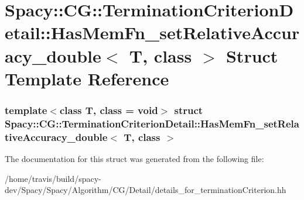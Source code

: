 \hypertarget{structSpacy_1_1CG_1_1TerminationCriterionDetail_1_1HasMemFn__setRelativeAccuracy__double}{\section{\-Spacy\-:\-:\-C\-G\-:\-:\-Termination\-Criterion\-Detail\-:\-:\-Has\-Mem\-Fn\-\_\-set\-Relative\-Accuracy\-\_\-double$<$ \-T, class $>$ \-Struct \-Template \-Reference}
\label{structSpacy_1_1CG_1_1TerminationCriterionDetail_1_1HasMemFn__setRelativeAccuracy__double}
}
\subsubsection*{template$<$class T, class = void$>$ struct Spacy\-::\-C\-G\-::\-Termination\-Criterion\-Detail\-::\-Has\-Mem\-Fn\-\_\-set\-Relative\-Accuracy\-\_\-double$<$ T, class $>$}



\-The documentation for this struct was generated from the following file\-:\begin{DoxyCompactItemize}
\item 
/home/travis/build/spacy-\/dev/\-Spacy/\-Spacy/\-Algorithm/\-C\-G/\-Detail/details\-\_\-for\-\_\-termination\-Criterion.\-hh\end{DoxyCompactItemize}
